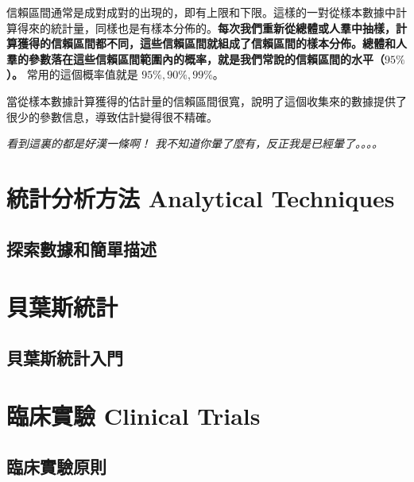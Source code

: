 \documentclass[]{ctexbook}
\begin{document}
信賴區間通常是成對成對的出現的，即有上限和下限。這樣的一對從樣本數據中計算得來的統計量，同樣也是有樣本分佈的。\textbf{每次我們重新從總體或人羣中抽樣，計算獲得的信賴區間都不同，這些信賴區間就組成了信賴區間的樣本分佈。總體和人羣的參數落在這些信賴區間範圍內的概率，就是我們常說的信賴區間的水平（\(95\%\)）。}
常用的這個概率值就是 \(95\%, 90\%, 99\%\)。

當從樣本數據計算獲得的估計量的信賴區間很寬，說明了這個收集來的數據提供了很少的參數信息，導致估計變得很不精確。

\emph{看到這裏的都是好漢一條啊！
我不知道你暈了麼有，反正我是已經暈了。。。。}

\part{統計分析方法 Analytical
Techniques}\label{part--analytical-techniques}

\chapter{探索數據和簡單描述}

\part{貝葉斯統計}\label{part-}

\chapter{貝葉斯統計入門}

\part{臨床實驗 Clinical Trials}\label{part--clinical-trials}

\chapter{臨床實驗原則}



\backmatter
\printindex
\end{document}
